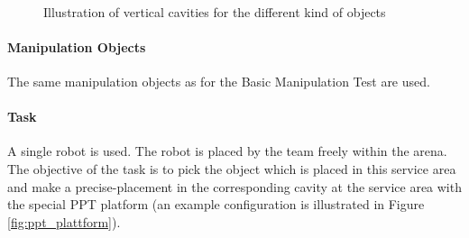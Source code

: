 \begin{figure} [h!]
\begin{center}
 \\
\end{center}
\caption{Illustration of vertical cavities for the different kind of objects}
\label{fig:ppt_horizontal_tiles}
\end{figure}

\paragraph{Manipulation Objects}
The same manipulation objects as for the Basic Manipulation Test are used. 

\paragraph{Task}
A single robot is used. The robot is placed by the team freely within the arena. The objective of the task is to pick the object which is placed in this service area and make a precise-placement in the corresponding cavity at the service area with the special PPT platform (an example configuration is illustrated in Figure \ref{fig:ppt_plattform}). 

